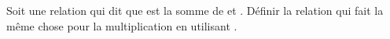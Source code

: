 \begin{Exercise}[title={Multiplication}]
Soit  une relation qui dit que 
est la somme de  et .  Définir la relation
 qui fait la même chose pour la multiplication en
utilisant .
\end{Exercise}
